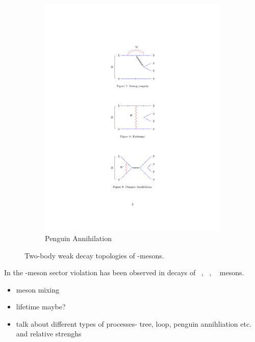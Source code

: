 \begin{figure}[!h]
\begin{subfigure}[b]{0.32\textwidth}
        \includegraphics[width=1.0\textwidth]{figs/Theory/PengAn.pdf}
        \caption{Penguin Annihilation}
    \end{subfigure}
    \caption{Two-body weak decay topologies of \bquark-mesons.}
    \label{fig:Theory_topo}   
\end{figure}


In the \bquark-meson sector \CP violation has been observed in decays of \Bp~\cite{PhysRevD.82.072004,PhysRevD.81.112002}, \Bz~\cite{PhysRevLett.87.091801,PhysRevLett.87.091802}, \Bs~\cite{PhysRevLett.110.221601} mesons.



{\color{Red}
\begin{itemize}
\item \B meson mixing
\item lifetime maybe?
\item talk about different types of processes- tree, loop, penguin annihliation etc. and relative strenghs 
\end{itemize}}

